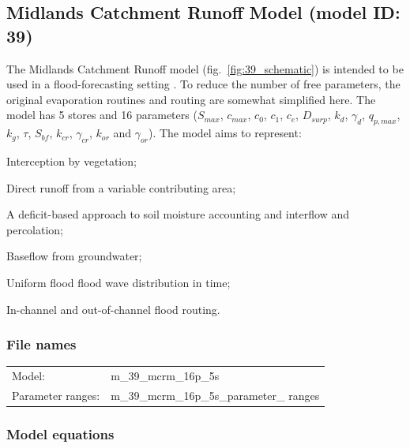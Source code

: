 \subsection{Midlands Catchment Runoff  Model (model ID: 39)}
The Midlands Catchment Runoff model (fig.~\ref{fig:39_schematic}) is intended to be used in a flood-forecasting setting \citep{Moore2001}. To reduce the number of free parameters, the original evaporation routines and routing are somewhat simplified here. The model has 5 stores and 16 parameters ($S_{max}$, $c_{max}$, $c_0$, $c_1$, $c_e$, $D_{surp}$, $k_d$, $\gamma_d$, $q_{p,max}$, $k_g$, $\tau$, $S_{bf}$, $k_{cr}$, $\gamma_{cr}$, $k_{or}$ and $\gamma_{or}$). The model aims to represent:

\begin{itemizecompact}
\item Interception by vegetation;
\item Direct runoff from a variable contributing area;
\item A deficit-based approach to soil moisture accounting and interflow and percolation;
\item Baseflow from groundwater;
\item Uniform flood flood wave distribution in time;
\item In-channel and out-of-channel flood routing.
\end{itemizecompact}

\subsubsection{File names}
\begin{tabular}{@{}ll}
Model: &m\_39\_mcrm\_16p\_5s \\
Parameter ranges: &m\_39\_mcrm\_16p\_5s\_parameter\_ ranges \\
\end{tabular}

\subsubsection{Model equations}


